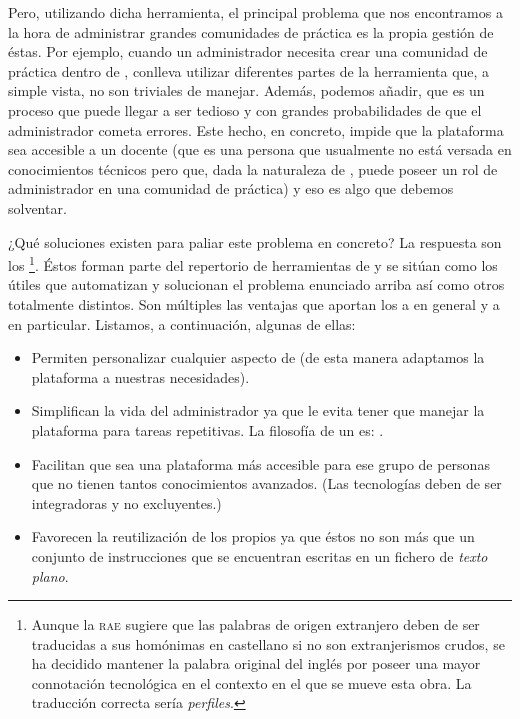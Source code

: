 Pero, utilizando dicha herramienta, el principal problema que nos encontramos a la hora de administrar grandes comunidades de práctica es la propia gestión de éstas. Por ejemplo, cuando un administrador necesita crear una comunidad de práctica dentro de \tiki{}, conlleva utilizar diferentes partes de la herramienta que, a simple vista, no son triviales de manejar. Además, podemos añadir, que es un proceso que puede llegar a ser tedioso y con grandes probabilidades de que el administrador cometa errores. Este hecho, en concreto, impide que la plataforma sea accesible a un docente (que es una persona que usualmente no está versada en conocimientos técnicos pero que, dada la naturaleza de \alma{}, puede poseer un rol de administrador en una comunidad de práctica) y eso es algo que debemos solventar.

¿Qué soluciones existen para paliar este problema en concreto? La respuesta son los \profiles{}\footnote{Aunque la \textsc{rae} sugiere que las palabras de origen extranjero deben de ser traducidas a sus homónimas en castellano si no son extranjerismos crudos, se ha decidido mantener la palabra original del inglés por poseer una mayor connotación tecnológica en el contexto en el que se mueve esta obra. La traducción correcta sería \textit{perfiles}.}. Éstos forman parte del repertorio de herramientas de \tiki{} y se sitúan como los útiles que automatizan y solucionan el problema enunciado arriba así como otros totalmente distintos. Son múltiples las ventajas que aportan los \profiles{} a \tiki{} en general y a \alma{} en particular. Listamos, a continuación, algunas de ellas:

\begin{itemize}
\item Permiten personalizar cualquier aspecto de \tiki{} (de esta manera adaptamos la plataforma a nuestras necesidades).
\item Simplifican la vida del administrador ya que le evita tener que manejar la plataforma para tareas repetitivas. La filosofía de un \profile{} es: .
\item Facilitan que \tiki{} sea una plataforma más accesible para ese grupo de personas que no tienen tantos conocimientos avanzados. (Las tecnologías deben de ser integradoras y no excluyentes.)
\item Favorecen la reutilización de los propios \profiles{} ya que éstos no son más que un conjunto de instrucciones que se encuentran escritas en un fichero de \textit{texto plano}.
\end{itemize}

